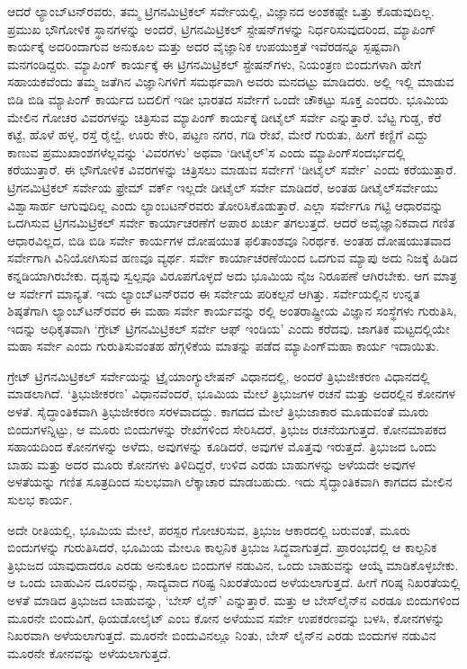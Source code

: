 ಆದರೆ ಲ್ಯಾಂಬ್​ಟನ್​ರವರು, ತಮ್ಮ ಟ್ರಿಗನಮಿಟ್ರಿಕಲ್​ ಸರ್ವೇಯಲ್ಲಿ, ವಿಜ್ಞಾನದ ಅಂಶಕಷ್ಟೇ ಒತ್ತು ಕೊಡುವುದಿಲ್ಲ. ಪ್ರಮುಖ ಭೌಗೋಳಿಕ ಸ್ಥಾನಗಳನ್ನು ಅಂದರೆ, ಟ್ರಿಗನಮಿಟ್ರಿಕಲ್​ ಸ್ಟೇಷನ್​ಗಳನ್ನು ನಿರ್ಧರಿಸುವುದರಿಂದ, ಮ್ಯಾಪಿಂಗ್​ ಕಾರ್ಯಕ್ಕೆ ಅದರಿಂದಾಗುವ ಅನುಕೂಲ ಮತ್ತು ಅದರ ವೈಜ್ಞಾನಿಕ ಉಪಯುಕ್ತತೆ ಇವೆರಡನ್ನೂ ಸ್ಪಷ್ಟವಾಗಿ ಮನಗಂಡಿದ್ದರು. ಮ್ಯಾಪಿಂಗ್​ ಕಾರ್ಯಕ್ಕೆ ಈ ಟ್ರಿಗನಮಿಟ್ರಿಕಲ್​ ಸ್ಟೇಷನ್​ಗಳು, ನಿಯಂತ್ರಣ ಬಿಂದುಗಳಾಗಿ ಹೇಗೆ ಸಹಾಯಕವೆಂದು ತಮ್ಮ ಜತೆಗಿನ ವಿಜ್ಞಾನಿಗಳಿಗೆ ಸಮರ್ಥವಾಗಿ ಅವರು ಮನದಟ್ಟು ಮಾಡಿದರು. ಅಲ್ಲಿ ಇಲ್ಲಿ ಮಾಡುವ ಬಿಡಿ ಬಿಡಿ ಮ್ಯಾಪಿಂಗ್​ ಕಾರ್ಯದ ಬದಲಿಗೆ ಇಡೀ ಭಾರತದ ಸರ್ವೇಗೆ ಒಂದೇ ಚೌಕಟ್ಟು ಸೂಕ್ತ ಎಂದರು. ಭೂಮಿಯ ಮೇಲಿನ ಗೋಚರ ವಿವರಗಳನ್ನು ಚಿತ್ರಿಸುವ ಮ್ಯಾಪಿಂಗ್​ ಕಾರ್ಯಕ್ಕೆ ಡೀಟೈಲ್​ ಸರ್ವೇ ಎನ್ನುತ್ತಾರೆ. ಬೆಟ್ಟ ಗುಡ್ಡ, ಕೆರೆ ಕಟ್ಟೆ, ಹೊಳೆ ಹಳ್ಳ, ರಸ್ತೆ ರೈಲ್ವೆ, ಊರು ಕೇರಿ, ಪಟ್ಟಣ ನಗರ, ಗಡಿ ರೇಖೆ, ಮೇರೆ ಗುರುತು, ಹೀಗೆ ಕಣ್ಣಿಗೆ ಎದ್ದು ಕಾಣುವ ಪ್ರಮುಖಾಂಶಗಳೆಲ್ಲವನ್ನು ‘ವಿವರಗಳು’ ಅಥವಾ ‘ಡೀಟೈಲ್​’ಸ ಎಂದು ಮ್ಯಾಪಿಂಗ್​ ಸಂದರ್ಭದಲ್ಲಿ ಕರೆಯುತ್ತಾರೆ. ಈ ಭೌಗೋಳಿಕ ವಿವರಗಳನ್ನು ಚಿತ್ರಿಸಲು ಮಾಡುವ ಸರ್ವೇಗೆ ‘ಡೀಟೈಲ್​ ಸರ್ವೇ’ ಎಂದು ಕರೆಯುತ್ತಾರೆ. ಟ್ರಿಗನಮಿಟ್ರಿಕಲ್​ ಸರ್ವೇಯ ಫ್ರೇಮ್ ವರ್ಕ್ ಇಲ್ಲದೇ ಡೀಟೈಲ್​ ಸರ್ವೇ ಮಾಡಿದರೆ, ಅಂತಹ ಡೀಟೈಲ್​ ಸರ್ವೇಯು ವಿಶ್ವಾಸಾರ್ಹ ಆಗುವುದಿಲ್ಲ ಎಂದು ಲ್ಯಾಂಬಟನ್​ರವರು ತೋರಿಸಿಕೊಡುತ್ತಾರೆ. ಎಲ್ಲಾ ಸರ್ವೇಗೂ ಗಟ್ಟಿ ಆಧಾರವನ್ನು ಒದಗಿಸುವ ಟ್ರಿಗನಮಿಟ್ರಿಕಲ್​ ಸರ್ವೇ ಕಾರ್ಯಾಚರಣೆಗೆ ಅಪಾರ ಖರ್ಚು ತಗಲುತ್ತದೆ. ಆದರೆ ಅವೈಜ್ಞಾನಿಕವಾದ ಗಣಿತ ಆಧಾರವಿಲ್ಲದ, ಬಿಡಿ ಬಿಡಿ ಸರ್ವೇ ಕಾರ್ಯಗಳ ದೋಷಯುತ ಫಲಿತಾಂಶವೂ ನಿರರ್ಥಕ. ಅಂತಹ ದೋಷಯುತವಾದ ಸರ್ವೇಗಾಗಿ ವಿನಿಯೋಗಿಸುವ ಹಣವೂ ವ್ಯರ್ಥ. ಸರ್ವೇ ಕಾರ್ಯಾಚರಣೆಯಿಂದ ಒದಗುವ ಮ್ಯಾಪು ಅದು ನಿಜಕ್ಕೆ ಹಿಡಿದ ಕನ್ನಡಿಯಾಗಿರಬೇಕು. ದೃಶ್ಯವು ಸ್ವಲ್ಪವೂ ವಿರೂಪಗೊಳ್ಳದೆ ಅದು ಭೂಮಿಯ ನೈಜ ನಿರೂಪಣೆ ಆಗಿರಬೇಕು. ಆಗ ಮಾತ್ರ ಆ ಸರ್ವೇಗೆ ಮಾನ್ಯತೆ. ಇದು ಲ್ಯಾಂಬ್​ಟನ್​ರವರ ಈ ಸರ್ವೇಯ ಪರಿಕಲ್ಪನೆ ಆಗಿತ್ತು. ಸರ್ವೇಯಲ್ಲಿನ ಉನ್ನತ ಶಿಷ್ಠತೆಗಾಗಿ ಲ್ಯಾಂಬ್​ಟನ್​ರವರ ಈ ಮಹಾ ಸರ್ವೇ ಕಾರ್ಯವನ್ನು ರಲ್ಲಿ ಅಂತರಾಷ್ಟ್ರೀಯ ವಿಜ್ಞಾನ ಸಂಸ್ಥೆಗಳು ಗುರುತಿಸಿ, ಇದನ್ನು ಅಧಿಕೃತವಾಗಿ ‘ಗ್ರೇಟ್​ ಟ್ರಿಗನಮಿಟ್ರಿಕಲ್​ ಸರ್ವೇ ಆಫ್​ ಇಂಡಿಯ’ ಎಂದು ಕರೆದವು. ಜಾಗತಿಕ ಮಟ್ಟದಲ್ಲಿಯೇ ಮಹಾ ಸರ್ವೇ ಎಂದು ಗುರುತಿಸುವಂತಹ ಹೆಗ್ಗಳಿಕೆಯ ಮಾತನ್ನು ಪಡೆದ ಮ್ಯಾಪಿಂಗ್​ ಮಹಾ ಕಾರ್ಯ ಇದಾಯಿತು.

ಗ್ರೇಟ್​ ಟ್ರಿಗನಮಿಟ್ರಿಕಲ್​ ಸರ್ವೇಯನ್ನು ಟ್ರೈಯಾಂಗ್ಯುಲೇಷನ್​ ವಿಧಾನದಲ್ಲಿ, ಅಂದರೆ ತ್ರಿಭುಜೀಕರಣ ವಿಧಾನದಲ್ಲಿ ಮಾಡಲಾಗಿದೆ. ‘ತ್ರಿಭುಜೀಕರಣ’ ವಿಧಾನವೆಂದರೆ, ಭೂಮಿಯ ಮೇಲೆ ತ್ರಿಭುಜಗಳ ರಚನೆ ಮತ್ತು ಅದರಲ್ಲಿನ ಕೋನಗಳ ಅಳತೆ. ಸೈದ್ಧಾಂತಿಕವಾಗಿ ತ್ರಿಭುಜೀಕರಣ ಸರಳವಾದದ್ದು. ಕಾಗದದ ಮೇಲೆ ತ್ರಿಭುಜಾಕಾರ ಮೂಡುವಂತೆ ಮೂರು ಬಿಂದುಗಳನ್ನಿಟ್ಟು, ಆ ಮೂರು ಬಿಂದುಗಳನ್ನು ರೇಖೆಗಳಿಂದ ಸೇರಿಸಿದರೆ, ತ್ರಿಭುಜ ರಚನೆಯಗುತ್ತದೆ. ಕೋನಮಾಪಕದ ಸಹಾಯದಿಂದ ಕೋನಗಳನ್ನು ಅಳೆದು, ಅವುಗಳನ್ನು ಕೂಡಿದರೆ, ಅವುಗಳ ಮೊತ್ತವು  ಇರುತ್ತದೆ. ತ್ರಿಭುಜದ ಒಂದು ಬಾಹು ಮತ್ತು ಅದರ ಮೂರು ಕೋನಗಳು ತಿಳಿದಿದ್ದರೆ, ಉಳಿದ ಎರಡು ಬಾಹುಗಳನ್ನು ಅಳೆಯದೇ ಅವುಗಳ ಅಳತೆಯನ್ನು ಗಣಿತ ಸೂತ್ರದಿಂದ ಸುಲಭವಾಗಿ ಲೆಕ್ಕಾಚಾರ ಮಾಡಬಹುದು. ಇದು ಸೈದ್ಧಾಂತಿಕವಾಗಿ ಕಾಗದದ ಮೇಲಿನ ಸುಲಭ ಕಾರ್ಯ.

ಅದೇ ರೀತಿಯಲ್ಲಿ, ಭೂಮಿಯ ಮೇಲೆ, ಪರಸ್ಪರ ಗೋಚರಿಸುವ, ತ್ರಿಭುಜ ಆಕಾರದಲ್ಲಿ ಬರುವಂತೆ, ಮೂರು ಬಿಂದುಗಳನ್ನು ಗುರುತಿಸಿದರೆ, ಭೂಮಿಯ ಮೇಲೂ ಕಾಲ್ಪನಿಕ ತ್ರಿಭುಜ ಸಿದ್ಧವಾಗುತ್ತದೆ. ಪ್ರಾರಂಭದಲ್ಲಿ ಆ ಕಾಲ್ಪನಿಕ ತ್ರಿಭುಜದ ಯಾವುದಾದರೂ ಎರಡು ಅನುಕೂಲ ಬಿಂದುಗಳ ನಡುವಿನ, ಒಂದು ಬಾಹುವನ್ನು ಆಯ್ಕೆ ಮಾಡಿಕೊಳ್ಳಬೇಕು. ಆ ಒಂದು ಬಾಹುವಿನ ದೂರವನ್ನು, ಸಾದ್ಯವಾದ ಗರಿಷ್ಟ ನಿಖರತೆಯಿಂದ ಅಳೆಯಲಾಗುತ್ತದೆ. ಹೀಗೆ ಗರಿಷ್ಠ ನಿಖರತೆಯಲ್ಲಿ ಅಳತೆ ಮಾಡಿದ ತ್ರಿಭುಜದ ಬಾಹುವನ್ನು, ‘ಬೇಸ್​ ಲೈನ್​’ ಎನ್ನುತ್ತಾರೆ. ಮತ್ತು ಆ ಬೇಸ್​ ಲೈನ್​ನ ಎರಡೂ ಬಿಂದುಗಳಿಂದ ಮೂರನೇ ಬಿಂದುವಿಗೆ, ಥಿಯಡೋಲೈಟ್​ ಎಂಬ ಕೋನ ಅಳೆಯುವ ಸರ್ವೇ ಉಪಕರಣವನ್ನು ಬಳಸಿ, ಕೋನಗಳನ್ನು ನಿಖರವಾಗಿ ಅಳೆಯಲಾಗುತ್ತದೆ. ಮೂರನೇ ಬಿಂದುವಿನಲ್ಲೂ ನಿಂತು, ಬೇಸ್​ ಲೈನ್​ನ ಎರಡು ಬಿಂದುಗಳ ನಡುವಿನ ಮೂರನೇ ಕೋನವನ್ನು ಅಳೆಯಲಾಗುತ್ತದೆ.

